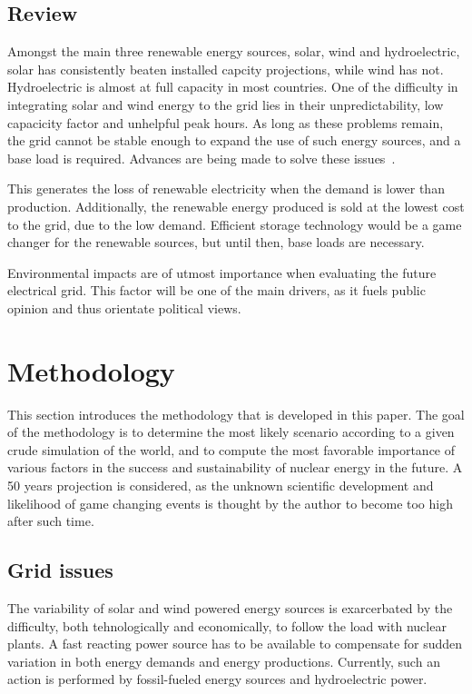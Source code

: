 \documentclass[IJPHM, 2017, 29]{PHMSociety}
\begin{document}
\subsection{Review}

Amongst the main three renewable energy sources, solar, wind and hydroelectric, solar has consistently beaten installed capcity projections, while wind has not. Hydroelectric is almost at full capacity in most countries. One of the difficulty in integrating solar and wind energy to the grid lies in their unpredictability, low capacicity factor and unhelpful peak hours. As long as these problems remain, the grid cannot be stable enough to expand the use of such energy sources, and a base load is required. Advances are being made to solve these issues~\citep{lund2007renewable}.

This generates the loss of renewable electricity when the demand is lower than production. Additionally, the renewable energy produced is sold at the lowest cost to the grid, due to the low demand. Efficient storage technology would be a game changer for the renewable sources, but until then, base loads are necessary.

Environmental impacts are of utmost importance when evaluating the future electrical grid. This factor will be one of the main drivers, as it fuels public opinion and thus orientate political views.


\section{Methodology}
\label{sec:meth}

This section introduces the methodology that is developed in this paper. The goal of the methodology is to determine the most likely scenario according to a given crude simulation of the world, and to compute the most favorable importance of various factors in the success and sustainability of nuclear energy in the future. A 50 years projection is considered, as the unknown scientific development and likelihood of game changing events is thought by the author to become too high after such time.

\subsection{Grid issues}

The variability of solar and wind powered energy sources is exarcerbated by the difficulty, both tehnologically and economically, to follow the load with nuclear plants. A fast reacting power source has to be available to compensate for sudden variation in both energy demands and energy productions. Currently, such an action is performed by fossil-fueled energy sources and hydroelectric power.
\end{document}
